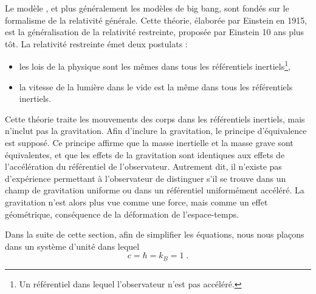 Le modèle \lcdm{}, et plus généralement les modèles de big bang, sont fondés sur le formalisme de la relativité générale.
Cette théorie, élaborée par Einstein en 1915, est la généralisation de la relativité restreinte, proposée par Einstein 10 ans plus tôt. La relativité restreinte émet deux postulats :
  \begin{itemize}[label=$\bullet$]
  \item les lois de la physique sont les mêmes dans tous les référentiels inertiels\footnote{Un référentiel dans lequel l'observateur n'est pas accéléré.},
  \item la vitesse de la lumière dans le vide est la même dans tous les référentiels inertiels.
  \end{itemize}
Cette théorie traite les mouvements des corps dans les référentiels inertiels, mais n'inclut pas la gravitation. Afin d'inclure la gravitation, le principe d'équivalence est supposé.
Ce principe affirme que la masse inertielle et la masse grave sont équivalentes, et que les effets de la gravitation sont identiques aux effets de l'accélération du référentiel de l'observateur. Autrement dit, il n'existe pas d'expérience permettant à l'observateur de distinguer s'il se trouve dans un champ de gravitation uniforme ou dans un référentiel uniformément accéléré. La gravitation n'est alors plus vue comme une force, mais comme un effet géométrique, conséquence de la déformation de l'espace-temps.

Dans la suite de cette section, afin de simplifier les équations, nous nous plaçons dans un système d'unité dans lequel
  \begin{equation}
    c = \hbar = k_{B} = 1  \; .
  \end{equation}


